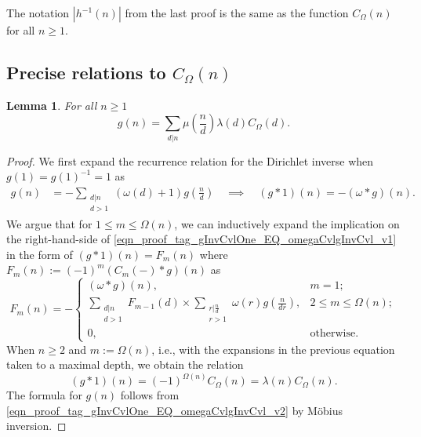\documentclass[11pt,reqno,a4letter]{article}
\numberwithin{equation}{section}
\numberwithin{figure}{section}
\numberwithin{table}{section}
\theoremstyle{plain}
\newtheorem{lemma}[theorem]{Lemma}
\numberwithin{theorem}{section}
\theoremstyle{definition}
\begin{document}
The notation $|h^{-1}(n)|$ from the last proof is the same as 
the function $C_{\Omega}(n)$ for all $n \geq 1$. 

\subsection{Precise relations to $C_{\Omega}(n)$} 
\label{Section_InvFunc_PreciseExpsAndAsymptotics} 
\label{subSection_Relating_CknFuncs_to_gInvn} 

\begin{lemma} 
\label{lemma_AnExactFormulaFor_gInvByMobiusInv_v1} 
For all $n \geq 1$ 
\[
g(n) = \sum_{d|n} \mu\left(\frac{n}{d}\right) \lambda(d) C_{\Omega}(d). 
\]
\end{lemma}
\begin{proof} 
We first expand the recurrence relation for the Dirichlet inverse 
when $g(1) = g(1)^{-1} = 1$ as 
\begin{align} 
\label{eqn_proof_tag_gInvCvlOne_EQ_omegaCvlgInvCvl_v1} 
g(n) & = - \sum_{\substack{d|n \\ d>1}} (\omega(d) + 1) g\left(\frac{n}{d}\right) 
     \quad\implies\quad 
     (g \ast 1)(n) = -(\omega \ast g)(n). 
\end{align} 
We argue that for $1 \leq m \leq \Omega(n)$, we can inductively expand the 
implication on the right-hand-side of \eqref{eqn_proof_tag_gInvCvlOne_EQ_omegaCvlgInvCvl_v1} 
in the form of $(g \ast 1)(n) = F_m(n)$ where 
$F_m(n) := (-1)^{m} (C_m(-) \ast g)(n)$ as 
\[
F_m(n) = - 
     \begin{cases} 
     (\omega \ast g)(n), & m = 1; \\ 
     \sum\limits_{\substack{d|n \\ d > 1}} F_{m-1}(d) \times \sum\limits_{\substack{r|\frac{n}{d} \\ r > 1}} 
     \omega(r) g\left(\frac{n}{dr}\right), & 2 \leq m \leq \Omega(n); \\ 
     0, & \text{otherwise.} 
     \end{cases} 
\]
When $n \geq 2$ and $m := \Omega(n)$, i.e., with the expansions 
in the previous equation taken to a maximal depth, we obtain the relation 
\begin{equation} 
\label{eqn_proof_tag_gInvCvlOne_EQ_omegaCvlgInvCvl_v2} 
(g \ast 1)(n) = (-1)^{\Omega(n)} C_{\Omega}(n) = \lambda(n) C_{\Omega}(n). 
\end{equation} 
The formula for $g(n)$ follows from 
\eqref{eqn_proof_tag_gInvCvlOne_EQ_omegaCvlgInvCvl_v2} 
by M\"obius inversion. 
\end{proof} 
\end{document}
